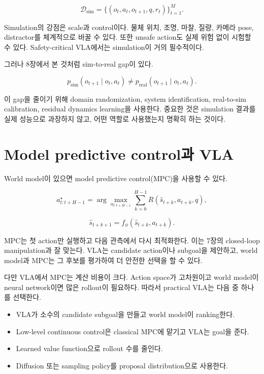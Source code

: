 \begin{equation}
  \mathcal{D}_{\mathrm{sim}}
  =
  \{(o_t,a_t,o_{t+1},q,r_t)\}_{t=1}^{M}.
\end{equation}

Simulation의 강점은 scale과 control이다. 물체 위치, 조명, 마찰, 질량, 카메라 pose, distractor를 체계적으로 바꿀 수 있다. 또한 unsafe action도 실제 위험 없이 시험할 수 있다. Safety-critical VLA에서는 simulation이 거의 필수적이다.

그러나 8장에서 본 것처럼 sim-to-real gap이 있다.

\begin{equation}
  p_{\mathrm{sim}}(o_{t+1}\mid o_t,a_t)
  \ne
  p_{\mathrm{real}}(o_{t+1}\mid o_t,a_t).
\end{equation}

이 gap을 줄이기 위해 domain randomization, system identification, real-to-sim calibration, residual dynamics learning을 사용한다. 중요한 것은 simulation 결과를 실제 성능으로 과장하지 않고, 어떤 역할로 사용했는지 명확히 하는 것이다.

\section{Model predictive control과 VLA}

World model이 있으면 model predictive control(MPC)을 사용할 수 있다.

\begin{equation}
  a_{t:t+H-1}^\star
  =
  \arg\max_{a_{t:t+H-1}}
  \sum_{k=0}^{H-1}
  R(\hat{s}_{t+k},a_{t+k},q),
\end{equation}

\begin{equation}
  \hat{s}_{t+k+1}
  =
  f_\phi(\hat{s}_{t+k},a_{t+k}).
\end{equation}

MPC는 첫 action만 실행하고 다음 관측에서 다시 최적화한다. 이는 7장의 closed-loop manipulation과 잘 맞는다. VLA는 candidate action이나 subgoal을 제안하고, world model과 MPC는 그 후보를 평가하여 더 안전한 선택을 할 수 있다.

다만 VLA에서 MPC는 계산 비용이 크다. Action space가 고차원이고 world model이 neural network이면 많은 rollout이 필요하다. 따라서 practical VLA는 다음 중 하나를 선택한다.

\begin{itemize}
  \item VLA가 소수의 candidate subgoal을 만들고 world model이 ranking한다.
  \item Low-level continuous control은 classical MPC에 맡기고 VLA는 goal을 준다.
  \item Learned value function으로 rollout 수를 줄인다.
  \item Diffusion 또는 sampling policy를 proposal distribution으로 사용한다.
\end{itemize}

